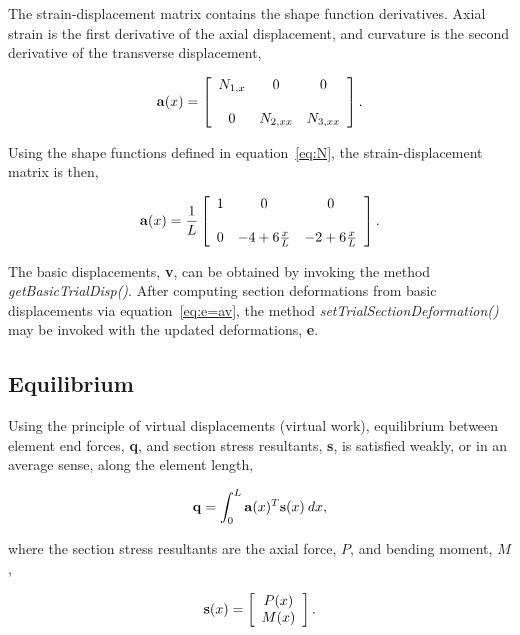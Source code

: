 \documentclass[12pt]{article}
\begin{document}
\noindent The strain-displacement matrix contains the shape function derivatives.
Axial strain is the first derivative of the axial displacement, and
curvature is the second derivative of the transverse displacement,

\begin{equation}
{\bf a}(x) = \left[ \begin{array}{ccc}
N_{1,x} & 0 & 0 \\ \\
0 & N_{2,xx} & N_{3,xx}
\end{array}
\right].
\end{equation}

\noindent Using the shape functions defined in equation~\ref{eq:N}, the
strain-displacement matrix is then,

\begin{equation}
{\bf a}(x) = \frac{1}{L} \left[ \begin{array}{ccc}
1 & 0 & 0 \\ \\
0 & -4+6\frac{x}{L} & -2+6\frac{x}{L}
\end{array}
\right].
\end{equation}

\noindent The basic displacements, {\bf v}, can be obtained by invoking
the method {\em getBasicTrialDisp()}.
After computing section deformations from basic displacements via
equation~\ref{eq:e=av}, the
method {\em setTrialSectionDeformation()} may be invoked with the updated
deformations, {\bf e}.

\subsection{Equilibrium}
Using the principle of virtual displacements (virtual work),
equilibrium between element end forces, {\bf q}, and section stress
resultants, {\bf s},
is satisfied weakly, or in an average sense, along the element length,

\begin{equation}
\label{eq:q}
{\bf q} = \int_0^L {\bf a}(x)^T {\bf s}(x) \: dx,
\end{equation}

\noindent where the section stress resultants are the axial force, $P$, and bending
moment, $M$,

\begin{equation}
{\bf s}(x) =
\left[ \begin{array}{c} P(x) \\ M(x) \end{array} \right].
\end{equation}
\end{document}
